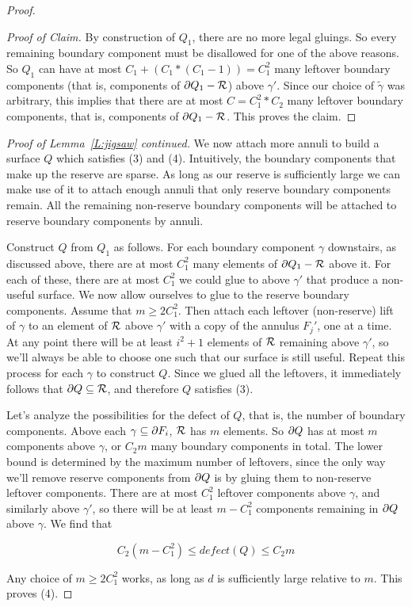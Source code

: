 \begin{proof}
\begin{proof}[Proof of Claim]
By construction of $Q_1$, there are no more legal gluings. So every remaining
boundary component must be disallowed for one of the above reasons. So $Q_1$
can have at most $C_1+(C_1*(C_1-1)) = C_1^2$ many leftover boundary components
(that is, components of $\partial Q_1 - \mathcal{R}$) above $\gamma'$.  Since our choice of
$\widetilde{\gamma}$ was arbitrary, this implies that there are at most $C
= C_1^2*C_2$ many leftover boundary components, that is, components of $\partial
Q_1-\mathcal{R}$. This proves the claim.

\end{proof}

\noindent \emph{Proof of Lemma~\ref{L:jigsaw} continued.} We now attach more
annuli to build a surface $Q$ which satisfies (3) and (4). Intuitively, the
boundary components that make up the reserve are sparse. As long as our reserve
is sufficiently large we can make use of it to attach enough annuli that only
reserve boundary components remain. All the remaining non-reserve boundary
components will be attached to reserve boundary components by annuli.

Construct $Q$ from $Q_1$ as follows.  For each boundary component $\gamma$
downstairs, as discussed above, there are at most $C_1^2$ many elements of $\partial
Q_1 - \mathcal{R}$ above it.  For each of these, there are at most $C_1^2$ we could
glue to above $\gamma'$ that produce a non-useful surface. We now allow
ourselves to glue to the reserve boundary components. Assume that $m\geq
2C_1^2$.  Then attach each leftover (non-reserve) lift of $\gamma$ to an
element of $\mathcal{R}$ above $\gamma'$ with a copy of the annulus $F_j'$, one at
a time.  At any point there will be at least $i^2+1$ elements of $\mathcal{R}$
remaining above $\gamma'$, so we'll always be able to choose one such that our
surface is still useful.  Repeat this process for each $\gamma$ to construct
$Q$.  Since we glued all the leftovers, it immediately follows that $\partial Q \subseteq
\mathcal{R}$, and therefore $Q$ satisfies (3).

Let's analyze the possibilities for the defect of $Q$, that is, the number of
boundary components.  Above each $\gamma \subseteq \partial F_i$, $\mathcal{R}$ has $m$ elements.
So $\partial Q$ has at most $m$ components above $\gamma$, or $C_2m$ many boundary
components in total. The lower bound is determined by the maximum number of
leftovers, since the only way we'll remove reserve components from $\partial Q$ is
by gluing them to non-reserve leftover components. There are at most $C_1^2$
leftover components above $\gamma$, and similarly above $\gamma'$, so there
will be at least $m - C_1^2$ components remaining in $\partial Q$ above $\gamma$.
We find that

\[ C_2(m-C_1^2) \leq defect(Q) \leq C_2m \]

Any choice of $m\geq 2C_1^2$ works, as long as $d$ is sufficiently large
relative to $m$.  This proves (4).

\end{proof}

